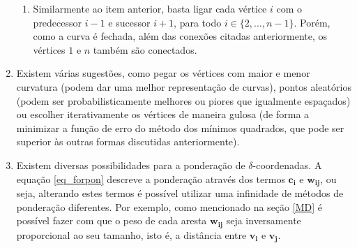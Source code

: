 \begin{enumerate}
\begin{enumerate}
        \item Similarmente ao item anterior, basta ligar cada vértice $i$ com o predecessor $i-1$ e sucessor $i+1$, para todo $i \in \{2, \dots, n-1\}$. Porém, como a curva é fechada, além das conexões citadas anteriormente, os vértices $1$ e $n$ também são conectados.
    \end{enumerate}
    
    \item Existem várias sugestões, como pegar os vértices com maior e menor curvatura (podem dar uma melhor representação de curvas), pontos aleatórios (podem ser probabilisticamente melhores ou piores que igualmente espaçados) ou escolher iterativamente os vértices de maneira gulosa (de forma a minimizar a função de erro do método dos mínimos quadrados, que pode ser superior às outras formas discutidas anteriormente).
    
    \item Existem diversas possibilidades para a ponderação de $\delta$-coordenadas. A equação \ref{eq_forpon} descreve a ponderação através dos termos $\mathbf{c_i}$ e $\mathbf{w_{ij}}$, ou seja, alterando estes termos é possível utilizar uma infinidade de métodos de ponderação diferentes. Por exemplo, como mencionado na seção \ref{MD} é possível fazer com que o peso de cada aresta $\mathbf{w_{ij}}$ seja inversamente proporcional ao seu tamanho, isto é, a distância entre $\mathbf{v_i}$ e $\mathbf{v_j}$.
    
\end{enumerate}
